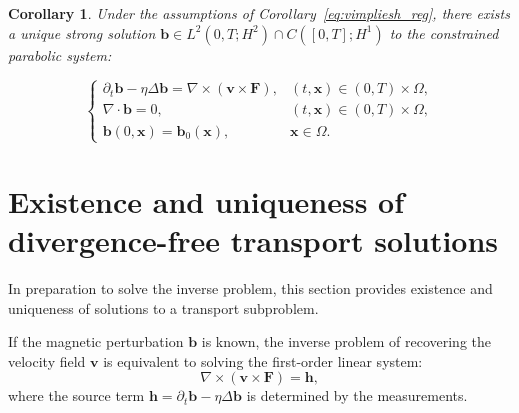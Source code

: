 \documentclass[12pt]{article}
\newtheorem{corollary}{Corollary}
\newtheorem{remark}{Remark}
\begin{document}
\begin{corollary}\label{corr:divfree_existence}
Under the assumptions of Corollary~\ref{eq:vimpliesh_reg}, there exists a unique strong solution $\boldsymbol{b} \in L^2(0,T; H^2) \cap C([0,T]; H^1)$ to the constrained parabolic system:

\begin{equation}
\left\{
{{} \begin{array}{ll}
\partial_t \boldsymbol{b} - \eta \Delta \boldsymbol{b} = \nabla \times (  \boldsymbol{v}\times \mathbf{F}),
& (t,\boldsymbol{x}) \in (0,T)\times\Omega, \\[1ex]
\nabla \cdot \boldsymbol{b} = 0, & (t,\boldsymbol{x}) \in (0,T)\times\Omega, \\
\boldsymbol{b}(0,\boldsymbol{x}) = \boldsymbol{b}_0(\boldsymbol{x}),
 &\boldsymbol{x}\in\Omega.
\end{array}}
\right.
\label{eq:forwardproblem_divfree}
\end{equation}    
\end{corollary}







		

	\section{Existence and uniqueness of divergence-free transport solutions}\label{Section:induction_subproblem}

 In preparation to solve the inverse problem, this section provides existence and uniqueness of solutions to a transport subproblem.
 
If the magnetic perturbation $\boldsymbol{b}$ is known, the inverse problem of recovering the velocity field $\boldsymbol{v}$ is equivalent to solving the first-order linear system:
\begin{equation}
  {{} \nabla \times (\boldsymbol{v}\times \mathbf{F} ) = \boldsymbol{h},\label{eq:fnablaV}    }
\end{equation}
where the source term $\boldsymbol{h} = \partial_t \boldsymbol{b} - \eta \Delta \boldsymbol{b}$ is determined by the measurements.
\end{document}
